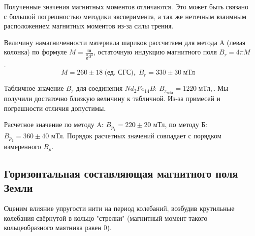 \documentclass[a4paper,12pt]{article}
\begin{document}
Полученные значения магнитных моментов отличаются. Это может быть связано с большой погрешностью методики эксперимента, а так же неточным взаимным расположением магнитных моментов из-за силы трения.

Величину намагниченности материала шариков рассчитаем для метода A (левая колонка) по формуле $M = \frac{\mathfrak{m}}{\frac{\pi}{6} d^3}$, остаточную индукцию магнитного поля $B_r = 4\pi M$. $$M = 260 \pm 18 \; \text{(ед. СГС)}, \; B_r = 330 \pm 30 \; \text{мТл}$$

Табличное значение $B_r$ для соединения $Nd_2Fe_{14}B$:
$B_{r_{\text{табл}}} = 1220 \; \text{мТл},$. Мы получили достаточно близкую величину к табличной. Из-за примесей и погрешности отличия допустимы.

Расчетное значение по методу A: $B_{p_1} = 220 \pm 20$ мТл, по методу Б: $B_{p_2} = 360\pm40$ мТл.
Порядок расчетных значений совпадает с порядком измеренного $B_p$.

\subsection{Горизонтальная составляющая магнитного поля Земли}

Оценим влияние упругости нити на период колебаний, возбудив крутильные колебания свёрнутой в кольцо "стрелки" (магнитный момент такого кольцеобразного маятника равен 0).
\end{document}
